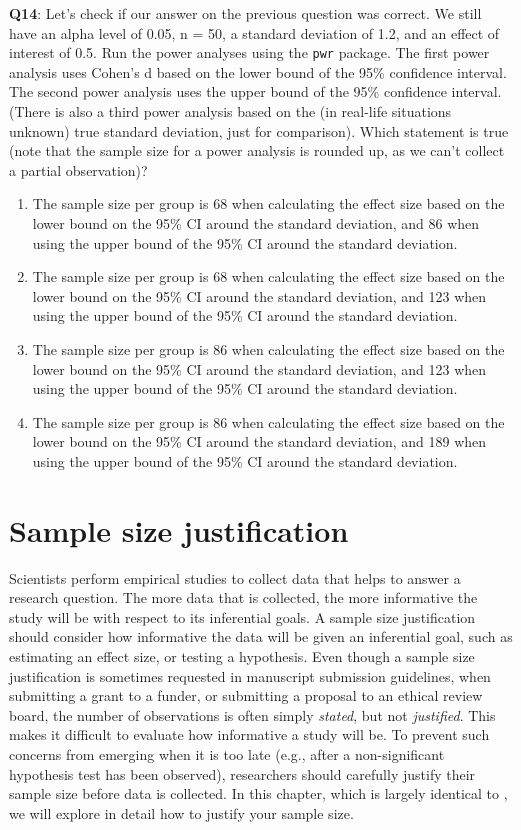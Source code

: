 \documentclass[
]{krantz}
\providecommand{\tightlist}{%
  \setlength{\itemsep}{0pt}\setlength{\parskip}{0pt}}
\begin{document}
\textbf{Q14}: Let's check if our answer on the previous question was correct. We still have an alpha level of 0.05, n = 50, a standard deviation of 1.2, and an effect of interest of 0.5. Run the power analyses using the \texttt{pwr} package. The first power analysis uses Cohen's d based on the lower bound of the 95\% confidence interval. The second power analysis uses the upper bound of the 95\% confidence interval. (There is also a third power analysis based on the (in real-life situations unknown) true standard deviation, just for comparison). Which statement is true (note that the sample size for a power analysis is rounded up, as we can't collect a partial observation)?

\begin{enumerate}
\def\labelenumi{\Alph{enumi})}
\tightlist
\item
  The sample size per group is 68 when calculating the effect size based on the lower bound on the 95\% CI around the standard deviation, and 86 when using the upper bound of the 95\% CI around the standard deviation.
\item
  The sample size per group is 68 when calculating the effect size based on the lower bound on the 95\% CI around the standard deviation, and 123 when using the upper bound of the 95\% CI around the standard deviation.
\item
  The sample size per group is 86 when calculating the effect size based on the lower bound on the 95\% CI around the standard deviation, and 123 when using the upper bound of the 95\% CI around the standard deviation.
\item
  The sample size per group is 86 when calculating the effect size based on the lower bound on the 95\% CI around the standard deviation, and 189 when using the upper bound of the 95\% CI around the standard deviation.
\end{enumerate}

\hypertarget{power}{%
\chapter{Sample size justification}\label{power}}

Scientists perform empirical studies to collect data that helps to answer a research question. The more data that is collected, the more informative the study will be with respect to its inferential goals. A sample size justification should consider how informative the data will be given an inferential goal, such as estimating an effect size, or testing a hypothesis. Even though a sample size justification is sometimes requested in manuscript submission guidelines, when submitting a grant to a funder, or submitting a proposal to an ethical review board, the number of observations is often simply \emph{stated}, but not \emph{justified}. This makes it difficult to evaluate how informative a study will be. To prevent such concerns from emerging when it is too late (e.g., after a non-significant hypothesis test has been observed), researchers should carefully justify their sample size before data is collected. In this chapter, which is largely identical to \citet{lakens_sample_2022}, we will explore in detail how to justify your sample size.
\end{document}

